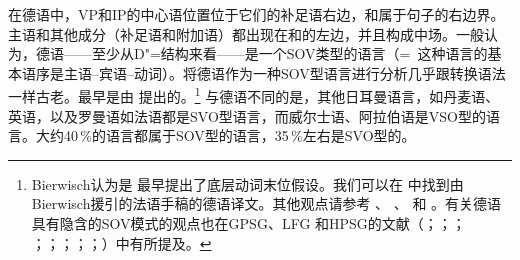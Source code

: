 在德语中，VP和IP的中心语位置位于它们的补足语右边，\vnullc 和\inullc 属于句子的右边界。主语和其他成分（补足语和附加语）都出现在\vnullc 和\inullc 的左边，并且构成中场。一般认为，德语——至少从D"=结构来看——是一个SOV类型的语言（=~这种语言的基本语序是主语--宾语--动词）。将德语作为一种SOV型语言进行分析几乎跟转换语法一样古老。最早是由 \citet*[]{Bierwisch63}提出的。\footnote{%
Bierwisch认为是 \citet{Fourquet57a}最早提出了底层动词末位假设。我们可以在 中找到由Bierwisch援引的法语手稿的德语译文。其他观点请参考 、 、 和 。有关德语具有隐含的SOV模式的观点也在GPSG\citep[]{Jacobs86a}、LFG \citep[\S~2.1.4]{Berman96a-u} 和HPSG的文献（\citealp*{KW91a}；\citealp{Oliva92a}；\citealp*{Netter92}；
\citealp*{Kiss93}；\citealp*{Frank94}；\citealp*{Kiss95a}；\citealp{Feldhaus97}；\citealp{Meurers2000b}；\citealp{Mueller2005c,MuellerGS}）中有所提及。
}
与德语不同的是，其他日耳曼语言，如丹麦语、英语，以及罗曼语如法语都是SVO型语言，而威尔士语、阿拉伯语是VSO型的语言。大约40\,\%的语言都属于SOV型的语言，35\,\%左右是SVO型的\citep{wals-81}。

